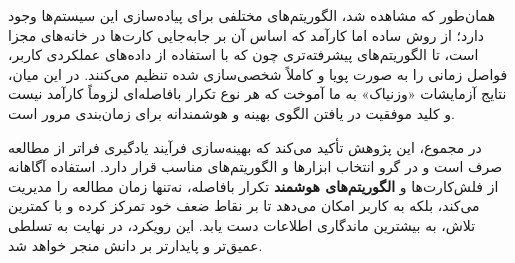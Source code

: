 \documentclass[12pt]{report}
\begin{document}
همان‌طور که مشاهده شد، الگوریتم‌های مختلفی برای پیاده‌سازی این سیستم‌ها وجود دارد؛ از روش ساده اما کارآمد  که اساس آن بر جابه‌جایی کارت‌ها در خانه‌های مجزا است، تا الگوریتم‌های پیشرفته‌تری چون  که با استفاده از داده‌های عملکردی کاربر، فواصل زمانی را به صورت پویا و کاملاً شخصی‌سازی شده تنظیم می‌کنند. در این میان، نتایج آزمایشات «وزنیاک» به ما آموخت که هر نوع تکرار بافاصله‌ای لزوماً کارآمد نیست و کلید موفقیت در یافتن الگوی بهینه و هوشمندانه برای زمان‌بندی مرور است.

در مجموع، این پژوهش تأکید می‌کند که بهینه‌سازی فرآیند یادگیری فراتر از مطالعه صرف است و در گرو انتخاب ابزارها و الگوریتم‌های مناسب قرار دارد. استفاده آگاهانه از فلش‌کارت‌ها و \textbf{الگوریتم‌های هوشمند} تکرار بافاصله، نه‌تنها زمان مطالعه را مدیریت می‌کند، بلکه به کاربر امکان می‌دهد تا بر نقاط ضعف خود تمرکز کرده و با کمترین تلاش، به بیشترین ماندگاری اطلاعات دست یابد. این رویکرد، در نهایت به تسلطی عمیق‌تر و پایدارتر بر دانش منجر خواهد شد.


\end{document}
